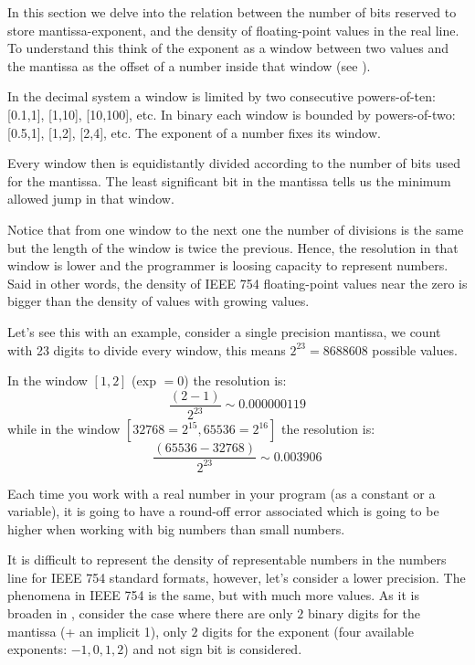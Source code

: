 In this section we delve into the relation between the number of bits reserved to store mantissa-exponent, 
and the density of floating-point values in the real line.
To understand this think of the exponent as a window between two values and the 
mantissa as the offset of a number inside that window (see \cite{VisExpl}).
 
In the decimal system a window is limited by two consecutive powers-of-ten: [0.1,1], [1,10], [10,100], etc. 
In binary each window is bounded by powers-of-two: [0.5,1], [1,2], [2,4], etc. The exponent of a number 
fixes its window. 

Every window then is equidistantly divided according to the number of bits used for the mantissa. The least significant bit 
in the mantissa tells us the minimum allowed jump in that window. 

Notice that from one window to the next one the number of divisions is the same but the length of the window is twice the previous.
Hence, the resolution in that window is lower and the programmer is loosing capacity to represent numbers. 
Said in other words, the density of IEEE 754 floating-point values near the zero is bigger than 
the density of values with growing values. 



Let's see this with an example, consider a single precision mantissa, we count with 23 digits to divide every window, 
this means $2^{23} = 8688608$ possible values. 

In the window $\left[1,2\right]$ (exp $= 0$) the resolution is:
$$
\frac{\left(2-1\right)}{2^{23}} \sim 0.000000119
$$ 
while in the window $\left[32768=2^{15},65536=2^{16}\right]$ the resolution is:
$$
\frac{\left(65536-32768\right)}{2^{23}} \sim 0.003906
$$

Each time you work with a real number in your program (as a constant or a variable), it is going to have a round-off error associated 
which is going to be higher when working with big numbers than small numbers. 




It is difficult to represent the density of representable numbers in the numbers line for IEEE 754 standard formats, 
however, let's consider a lower precision. The phenomena in IEEE 754 is the same, but with much more values.
As it is broaden in \cite{articleIEEE}, consider the case where there are only $2$ binary digits for the mantissa (+ an implicit 1),
only $2$ digits for the exponent (four available exponents: $-1, 0, 1, 2$) 
and not sign bit is considered.


